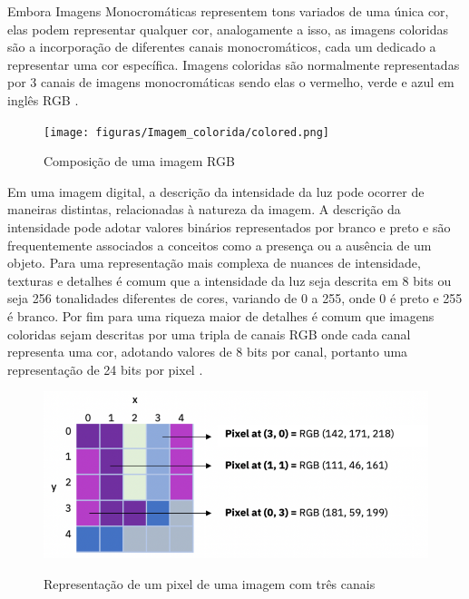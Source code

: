 Embora Imagens Monocromáticas representem tons variados de uma única cor, elas podem representar qualquer cor, analogamente a isso, as imagens coloridas são a incorporação de diferentes canais monocromáticos, cada um dedicado a representar uma cor específica. Imagens coloridas são normalmente representadas por 3 canais de imagens monocromáticas sendo elas o vermelho, verde e azul em inglês \ac{RGB} \cite{imagemIBM}.

\begin{figure}[H]
	\centering
    \caption{Composição de uma imagem RGB}
	\texttt{[image: figuras/Imagem\_colorida/colored.png]}
	\label{fig:Composicao de uma imagem RGB}
\end{figure}

Em uma imagem digital, a descrição da intensidade da luz pode ocorrer de maneiras distintas, relacionadas à natureza da imagem. A descrição da intensidade pode adotar valores binários representados por branco e preto e são frequentemente associados a conceitos como a presença ou a ausência de um objeto. Para  uma representação mais complexa de nuances de intensidade, texturas e detalhes é comum  que a intensidade da luz seja descrita em 8 bits ou seja 256 tonalidades diferentes de cores, variando de 0 a 255, onde 0 é preto e 255 é branco. Por fim para uma riqueza maior de detalhes é comum que imagens coloridas sejam descritas por uma tripla de canais \ac{RGB}  onde cada canal representa uma  cor, adotando valores de 8 bits por canal, portanto uma representação de 24 bits por pixel \cite{imagemIBM}.

\begin{figure}[H]
	\centering
	\caption{Representação de um pixel de uma imagem com três canais}
	\includegraphics[scale=1]{figuras/processamento_imagem/pixel.png}
	\label{fig:Representacao do Pixel de uma imagem com 3 canais}
\end{figure}



